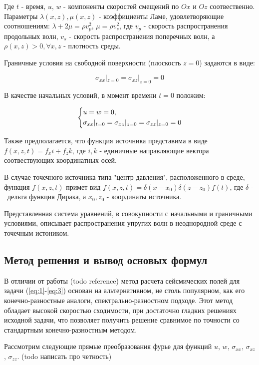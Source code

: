 Где $t$ - время, $u$, $w$ - компоненты скоростей смещений по $Ox$ и $Oz$ соотвественно.
Параметры $\lambda(x,z), \mu(x,z)$ - коэффициенты Ламе, удовлетворяющие соотношениям: $\lambda + 2\mu=\rho{v}_p^2$, $\mu=\rho{v}_s^2$, 
где $v_p$ - скорость распространения продольных волн, $v_s$ - скорость распространения поперечных волн,
а $\rho(x,z)>0, \forall x,z$ - плотность среды.

Граничные условия на свободной поверхности (плоскость $z = 0$) задаются в виде:

\begin{equation}
	\label{eq:2}
	\sigma_{xx}|_{z=0}=\sigma_{xz}|_{z=0}=0
\end{equation}

В качестве начальных условий, в момент времени $t=0$ положим:

\begin{equation}
\begin{dcases}
	\label{eq:3}
	u = w = 0, \\
	\sigma_{xx}|_{t=0}=\sigma_{xz}|_{z=0}=\sigma_{zz}|_{z=0}=0
\end{dcases}
\end{equation}

Также предполагается, что функция источника представима в виде $f(x,z,t)=f_xi+f_zk$,
где $i, k$ - единичные направляющие вектора соотвествующих координатных осей.

В случае точечного источника типа "центр давления", расположенного в среде, функция $f(x,z,t)$ примет вид $f(x,z,t)=\delta(x-x_0)\delta(z-z_0)f(t)$,
где $\delta$ -  дельта функция Дирака, а $x_0, z_0$ - координаты источника.

Представленная система уравнений, в совокупности с начальными и граничными условиями,
описывает распространения упругих волн в неоднородной среде с точечным истоником.

\subsection{Метод решения и вывод основых формул}
В отличии от работы (todo reference) метод расчета сейсмических полей для задачи (\ref{eq:1}-\ref{eq:3}) основан на альтернативном,
не столь популярном, как его конечно-разностные аналоги, спектрально-разностном подходе. Этот метод обладает высокой скоростью сходимости,
при достаточно гладких решениях исходной задачи, что позволяет получить решение сравнимое по точности со стандартным
конечно-разностным методом.

Рассмотрим следующие прямые преобразования фурье для функций $u$, $w$, $\sigma_{xx}$, $\sigma_{xz}$, $\sigma_{zz}$.
(todo написать про четность)

